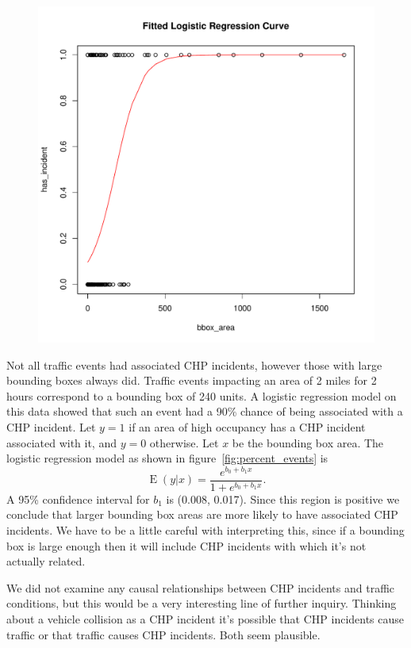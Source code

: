 \documentclass[12pt]{article}
\newcommand{\Exp}{\operatorname{E}}
\begin{document}
\begin{figure}
    \label{fig:logistic}
    \centering
    \includegraphics[scale=0.5]{../logistic.pdf}
    \caption{}
\end{figure}

Not all traffic events had associated CHP incidents, however those with
large bounding boxes always did. Traffic events impacting an area of 2
miles for 2 hours correspond to a bounding box of 240 units. A logistic
regression model on this data showed that such an event had a 90\% chance
of being associated with a CHP incident. Let $y = 1$ if an area of high
occupancy has a CHP incident associated with it, and $y = 0$ otherwise.
Let $x$ be the bounding box area. The logistic regression model as shown in
figure~\ref{fig:percent_events} is
\[
    \Exp (y | x) = \frac{e^{b_0 + b_1 x}}{1 + e^{b_0 + b_1 x}}.
\]
A 95\% confidence interval for $b_1$ is (0.008, 0.017). Since
this region is positive we conclude that larger bounding box areas are more
likely to have associated CHP incidents. We have to be a little careful
with interpreting this, since if a bounding box is large enough
then it will include CHP incidents with which it's not actually related.

We did not examine any causal relationships between CHP incidents and
traffic conditions, but this would be a very interesting line of further
inquiry. Thinking about a vehicle collision as a CHP incident it's possible
that CHP incidents cause traffic or that traffic causes CHP incidents.
Both seem plausible.
\end{document}
